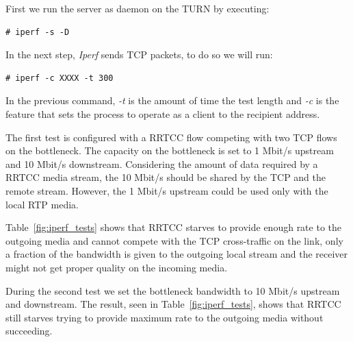 
First we run the server as daemon on the TURN by executing:

\begin{verbatim}
# iperf -s -D
\end{verbatim}

In the next step, {\it Iperf} sends TCP packets, to do so we will run:

\begin{verbatim}
# iperf -c XXXX -t 300
\end{verbatim}

In the previous command, {\it -t} is the amount of time the test length and {\it -c} is the feature that sets the process to operate as a client to the recipient address.

The first test is configured with a RRTCC flow competing with two TCP flows on the bottleneck. The capacity on the bottleneck is set to 1 Mbit/s upstream and 10 Mbit/s downstream. Considering the amount of data required by a RRTCC media stream, the 10 Mbit/s should be shared by the TCP and the remote stream. However, the 1 Mbit/s upstream could be used only with the local RTP media.

Table~\ref{fig:iperf_tests} shows that RRTCC starves to provide enough rate to the outgoing media and cannot compete with the TCP cross-traffic on the link, only a fraction of the bandwidth is given to the outgoing local stream and the receiver might not get proper quality on the incoming media.

During the second test we set the bottleneck bandwidth to 10 Mbit/s upstream and downstream. The result, seen in Table~\ref{fig:iperf_tests}, shows that RRTCC still starves trying to provide maximum rate to the outgoing media without succeeding.

